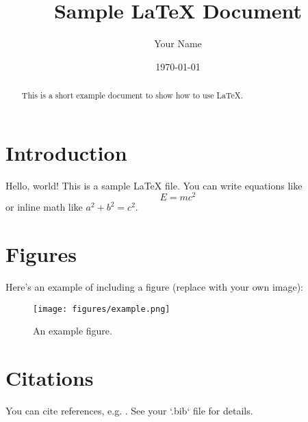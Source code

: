 \documentclass[12pt,a4paper]{article}
\title{Sample LaTeX Document}
\author{Your Name}
\date{\today}
\begin{document}
\maketitle

\begin{abstract}
This is a short example document to show how to use \LaTeX{}.
\end{abstract}

\section{Introduction}
Hello, world! This is a sample \LaTeX{} file.  
You can write equations like
\[
E = mc^2
\]
or inline math like $a^2 + b^2 = c^2$.

\section{Figures}
Here’s an example of including a figure (replace with your own image):

\begin{figure}[h!]
    \centering
    \texttt{[image: figures/example.png]}
    \caption{An example figure.}
    \label{fig:example}
\end{figure}

\section{Citations}
You can cite references, e.g. \citet{einstein1905}.  
See your `.bib` file for details.



\end{document}
